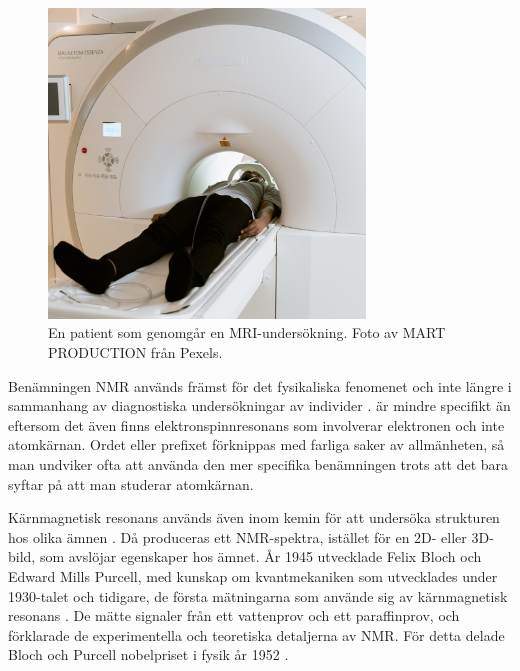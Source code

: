 \documentclass[11pt, a4paper]{article}
\begin{document}
\begin{figure}[ht]
	\centering
	\includegraphics[width=0.75\textwidth]{mri_patient}
	\caption{En patient som genomgår en MRI-undersökning. Foto av MART PRODUCTION \parencite*{fig:mri_patient} från Pexels.}
	\label{fig:mri_patient}
\end{figure}

Benämningen NMR används främst för det fysikaliska fenomenet och inte längre i sammanhang av diagnostiska undersökningar av individer \parencite{nmr_eller_mri}.  är mindre specifikt än  eftersom det även finns elektronspinnresonans som involverar elektronen och inte atomkärnan. Ordet  eller prefixet  förknippas med farliga saker av allmänheten, så man undviker ofta att använda den mer specifika benämningen trots att det bara syftar på att man studerar atomkärnan.

Kärnmagnetisk resonans används även inom kemin för att undersöka strukturen hos olika ämnen \parencite{nmr_kemi}. Då produceras ett NMR-spektra, istället för en 2D- eller 3D-bild, som avslöjar egenskaper hos ämnet. År 1945 utvecklade Felix Bloch och Edward Mills Purcell, med kunskap om kvantmekaniken som utvecklades under 1930-talet och tidigare, de första mätningarna som använde sig av kärnmagnetisk resonans \parencite{mri_lärobok}. De mätte signaler från ett vattenprov och ett paraffinprov, och förklarade de experimentella och teoretiska detaljerna av NMR. För detta delade Bloch och Purcell nobelpriset i fysik år 1952 \parencite{nmr_nobelpris}.
\end{document}
